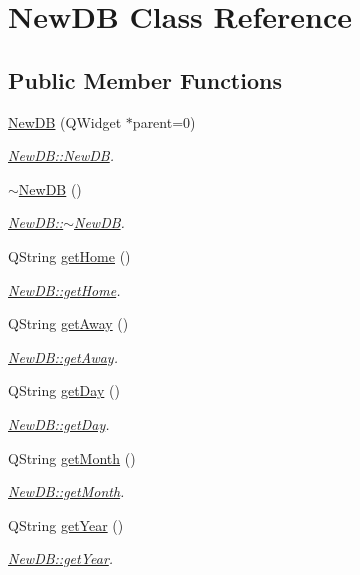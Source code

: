 \hypertarget{classNewDB}{\section{New\-D\-B Class Reference}
\label{classNewDB}
}
\subsection*{Public Member Functions}
\begin{DoxyCompactItemize}
\item 
\hyperlink{classNewDB_a90318aa23cfbd4830348df1a4d9888d6}{New\-D\-B} (Q\-Widget $\ast$parent=0)
\begin{DoxyCompactList}\small\item\em \hyperlink{classNewDB_a90318aa23cfbd4830348df1a4d9888d6}{New\-D\-B\-::\-New\-D\-B}. \end{DoxyCompactList}\item 
\hyperlink{classNewDB_ad191442bdb36ad005acd2537482d9786}{$\sim$\-New\-D\-B} ()
\begin{DoxyCompactList}\small\item\em \hyperlink{classNewDB_ad191442bdb36ad005acd2537482d9786}{New\-D\-B\-::$\sim$\-New\-D\-B}. \end{DoxyCompactList}\item 
Q\-String \hyperlink{classNewDB_ad8c4702d2d4b9807eca620e4ed4327e4}{get\-Home} ()
\begin{DoxyCompactList}\small\item\em \hyperlink{classNewDB_ad8c4702d2d4b9807eca620e4ed4327e4}{New\-D\-B\-::get\-Home}. \end{DoxyCompactList}\item 
Q\-String \hyperlink{classNewDB_ac03466849c4a73c91856dfe08c28b1e0}{get\-Away} ()
\begin{DoxyCompactList}\small\item\em \hyperlink{classNewDB_ac03466849c4a73c91856dfe08c28b1e0}{New\-D\-B\-::get\-Away}. \end{DoxyCompactList}\item 
Q\-String \hyperlink{classNewDB_ad630fe28801a02211b4e72f3b3b624f8}{get\-Day} ()
\begin{DoxyCompactList}\small\item\em \hyperlink{classNewDB_ad630fe28801a02211b4e72f3b3b624f8}{New\-D\-B\-::get\-Day}. \end{DoxyCompactList}\item 
Q\-String \hyperlink{classNewDB_a697a2084248738f1b865db3987963c87}{get\-Month} ()
\begin{DoxyCompactList}\small\item\em \hyperlink{classNewDB_a697a2084248738f1b865db3987963c87}{New\-D\-B\-::get\-Month}. \end{DoxyCompactList}\item 
Q\-String \hyperlink{classNewDB_aea2a694c34450d05fa1b500439fd10f3}{get\-Year} ()
\begin{DoxyCompactList}\small\item\em \hyperlink{classNewDB_aea2a694c34450d05fa1b500439fd10f3}{New\-D\-B\-::get\-Year}. \end{DoxyCompactList}\end{DoxyCompactItemize}


